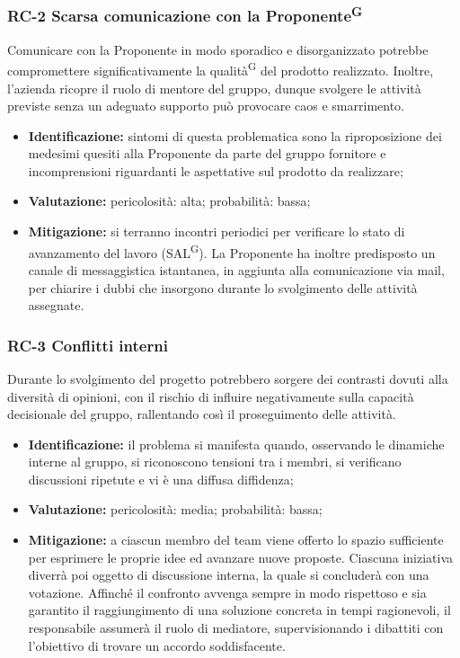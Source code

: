 \documentclass[8pt]{article}
\newcommand{\glossterm}[1]{#1\textsuperscript{G}} %
\begin{document}
\subsubsection{RC-2 Scarsa comunicazione con la \glossterm{Proponente}}
Comunicare con la Proponente in modo sporadico e disorganizzato potrebbe compromettere significativamente la \glossterm{qualità} del prodotto realizzato. Inoltre, l'azienda ricopre il ruolo di mentore del gruppo, dunque svolgere le attività previste senza un adeguato supporto può provocare caos e smarrimento.
\begin{itemize}
\setlength\itemsep{0em}
    \item \textbf{Identificazione:} sintomi di questa problematica sono la riproposizione dei medesimi quesiti alla Proponente da parte del gruppo fornitore e incomprensioni riguardanti le aspettative sul prodotto da realizzare;
    \item \textbf{Valutazione:} pericolosità: alta; probabilità: bassa;
    \item \textbf{Mitigazione:} si terranno incontri periodici per verificare lo stato di avanzamento del lavoro (\glossterm{SAL}). La Proponente ha inoltre predisposto un canale di messaggistica istantanea, in aggiunta alla comunicazione via mail, per chiarire i dubbi che insorgono durante lo svolgimento delle attività assegnate.
\end{itemize}

\subsubsection{RC-3 Conflitti interni}
Durante lo svolgimento del progetto potrebbero sorgere dei contrasti dovuti alla diversità di opinioni, con il rischio di influire negativamente sulla capacità decisionale del gruppo, rallentando così il proseguimento delle attività.
\begin{itemize}
\setlength\itemsep{0em}
    \item \textbf{Identificazione:} il problema si manifesta quando, osservando le dinamiche interne al gruppo, si riconoscono tensioni tra i membri, si verificano discussioni ripetute e vi è una diffusa diffidenza;
    \item \textbf{Valutazione:} pericolosità: media; probabilità: bassa;
    \item \textbf{Mitigazione:} a ciascun membro del team viene offerto lo spazio sufficiente per esprimere le proprie idee ed avanzare nuove proposte. Ciascuna iniziativa diverrà poi oggetto di discussione interna, la quale si concluderà con una votazione. Affinché il confronto avvenga sempre in modo rispettoso e sia garantito il raggiungimento di una soluzione concreta in tempi ragionevoli, il responsabile assumerà il ruolo di mediatore, supervisionando i dibattiti con l'obiettivo di trovare un accordo soddisfacente.
\end{itemize}
\end{document}
